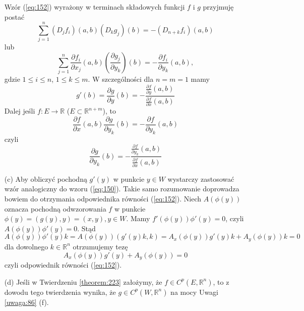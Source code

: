 \documentclass[leqno]{article}
\begin{document}
\begin{justify}
\begin{uwaga}
\begin{itemize}
        Wzór (\ref{eq:152}) wyrażony w terminach składowych funkcji $f$ i $g$ przyjmuję postać 
        \[
            \sum_{j=1}^{n}(D_j f_i)(a,b)(D_k g_j)(b) = -(D_{n+k}f_i)(a,b)
        \]
        lub 
        \[
            \sum_{j=1}^{n}\frac{\partial f_i}{\partial x_j}(a,b)(\frac{\partial g_j}{\partial y_k})(b) = - \frac{\partial f_i}{\partial y_k}(a,b),
        \]
        gdzie $1 \leqslant i \leqslant n$, $1 \leqslant k \leqslant m$. W szczególności dla $n = m = 1$ mamy 
        \[
            g'(b) = \frac{\partial g}{\partial y}(b) = -\frac{\frac{\partial f}{\partial y}(a,b)}{\frac{\partial f}{\partial x}(a,b)}
        \]
        Dalej jeśli $f : E \to \mathbb{R}$ ($E \subset \mathbb{R}^{n+m}$), to 
        \[
            \frac{\partial f}{\partial x}(a,b)\frac{\partial g}{\partial y_k}(b) = - \frac{\partial f}{\partial y_k}(a,b)
        \]
        czyli 
        \[
            \frac{\partial g}{\partial y_k}(b) = -\frac{\frac{\partial f}{\partial y_k}(a,b)}{\frac{\partial f}{\partial x}(a,b)}
        \]
    \item [(c)] Aby obliczyć pochodną $g'(y)$ w punkcie $y \in W$ wystarczy zastosować wzór analogiczny do wzoru (\ref{eq:150}). Takie samo 
        rozumowanie doprowadza bowiem do otrzymania odpowiednika równości (\ref{eq:152}). Niech $A(\phi(y))$ oznacza pochodną odwzorowania $f$ w punkcie $\phi(y)
        = (g(y), y) = (x,y), y \in W$. Mamy $f'(\phi(y))\phi'(y) = 0$, czyli $A(\phi(y))\phi'(y) = 0$. Stąd 
        \[
            A(\phi(y))\phi'(y)k = A(\phi(y))(g'(y)k, k) = A_x(\phi(y))g'(y)k + A_y(\phi(y))k = 0
        \]
        dla dowolnego $k \in \mathbb{R}^n$ otrzumujemy tezę 
        \[
            A_x(\phi(y))g'(y) + A_y(\phi(y)) = 0
        \]
        czyli odpowiednik równości (\ref{eq:152}). 
    \item [(d)] Jeśli w Twierdzeniu \ref{theorem:223} założymy, że $f \in C^p(E, \mathbb{R}^n)$, to z dowodu tego twierdzenia wynika, że 
        $g \in C^p(W, \mathbb{R}^n)$ na mocy Uwagi \ref{uwaga:86} (f).
    \end{itemize}
\end{uwaga}


\end{justify}
\end{document}
